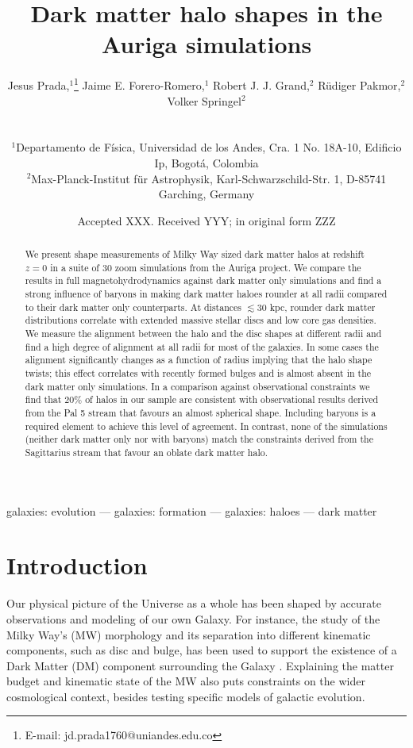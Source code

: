 \documentclass[usenatbib]{mnras}
\title[Dark matter halo shapes in Auriga] {Dark matter halo shapes in the Auriga simulations}
\author[Prada et al.]{
\parbox[t]{\textwidth}{
{Jesus Prada,$^{1}$\thanks{E-mail: jd.prada1760@uniandes.edu.co}}
{Jaime E. Forero-Romero,$^{1}$}
{Robert J. J. Grand,$^{2}$}
{R\"udiger Pakmor,$^{2}$}
{Volker Springel$^{2}$}
}
\\\\
$^{1}$Departamento de F\'isica, Universidad de los Andes, Cra. 1 No.
18A-10, Edificio Ip, Bogot\'a, Colombia\\
$^{2}$Max-Planck-Institut f\"ur Astrophysik, Karl-Schwarzschild-Str. 1, D-85741 Garching, Germany\\
}
\date{Accepted XXX. Received YYY; in original form ZZZ}
\begin{document}
\label{firstpage}
\pagerange{\pageref{firstpage}--\pageref{lastpage}}
\maketitle

\begin{abstract}
We present shape measurements of Milky Way sized dark matter halos at
redshift $z=0$ in a suite of 30 zoom simulations from the Auriga
project. 
We compare the results in full magnetohydrodynamics against dark
matter only simulations and find a strong influence of baryons 
in making dark matter haloes rounder at all radii compared to their dark 
matter only counterparts.
At distances $\lesssim 30$ kpc, rounder dark matter distributions
correlate with extended massive stellar discs and low core gas 
densities.  
We measure the alignment between the halo and the disc shapes at
different radii and find a high degree of alignment at all radii for most 
of the galaxies.
In some cases the alignment significantly changes as a function of
radius implying that the halo shape twists; 
this effect correlates with recently formed bulges and is almost
absent in the dark matter only simulations.  
In a comparison against observational constraints we find that $20\%$
of halos in our sample are consistent with observational results derived
from the Pal 5 stream that favours an almost spherical shape.
Including baryons is a required element to achieve this
level of agreement. In contrast, none of the simulations (neither dark matter
only nor with baryons) match the constraints derived from the
Sagittarius stream that favour an oblate dark matter halo.
\end{abstract}

\begin{keywords}
galaxies: evolution --- galaxies: formation --- galaxies: haloes ---
dark matter
\end{keywords}



\section{Introduction}

Our physical picture of the Universe as a whole has been shaped by
accurate observations and modeling of our own Galaxy. 
For instance, the study of the Milky Way's (MW) morphology and its
separation into different kinematic components, such as 
disc and bulge, has been used to support the existence of a Dark Matter (DM) component surrounding the Galaxy
\citep{2000MNRAS.311..361O,2009PASJ...61..227S,2010JCAP...08..004C,2013ApJ...779..115B,Iocco15}. 
Explaining the matter budget and kinematic state of the MW also puts constraints on the wider cosmological context, besides testing specific models of galactic evolution.
\end{document}
